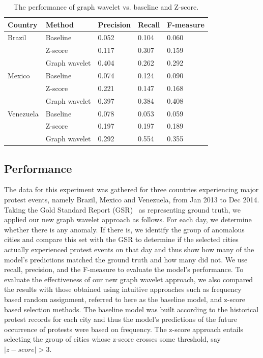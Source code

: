 \begin{table}[bt] %
\renewcommand{\arraystretch}{1.1}
\caption{\label{table:models_compare} The performance of graph wavelet vs. baseline and Z-score.}
\scriptsize
\centering
\begin{tabular}{ l | l |l | l | l}
\hline
\textbf{Country} & \textbf{Method}& \textbf{Precision}  & \textbf{Recall}  & \textbf{F-measure} \\
\hline
Brazil & Baseline & 0.052 &0.104 & 0.060\\
       & Z-score & 0.117&0.307 & 0.159 \\
 & Graph wavelet& 0.404 &0.262 & 0.292 \\
\hline
Mexico & Baseline & 0.074 &0.124 & 0.090 \\
       & Z-score & 0.221 &0.147 & 0.168 \\
 & Graph wavelet& 0.397 &0.384 & 0.408 \\
\hline
Venezuela & Baseline & 0.078 &0.053 & 0.059 \\
       & Z-score & 0.197 &0.197 & 0.189 \\
 & Graph wavelet& 0.292 &0.554 & 0.355 \\
\hline
\end{tabular}
\end{table}



\subsection{Performance}
The data for this experiment was gathered for three countries experiencing major protest events, namely Brazil, Mexico and Venezuela, from Jan 2013 to Dec 2014. Taking the Gold Standard Report (GSR)~\cite{ramakrishnan2014beating} as representing ground truth, we applied our new graph wavelet approach as follows. For each day, we determine whether there is any anomaly. If there is, we
identify the group of anomalous cities and compare this set
with the GSR to determine if the selected cities actually experienced protest events on that day and thus show how many of the model's predictions matched the ground truth and how many did not. We use recall, precision, and the F-measure to evaluate the model's performance. To evaluate the effectiveness of our new graph wavelet approach, we also compared the results with those obtained using intuitive approaches such as frequency based random assignment, referred to here as the baseline model, and z-score based selection methods. The baseline model was built according to the historical protest records for each city and thus the model's predictions of the future occurrence of protests were based on frequency. The z-score approach entails
selecting the group of cities whose z-score crosses some threshold, say $|z-score|>3$.



